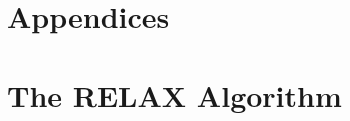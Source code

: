 \documentclass{article}
\begin{document}



\clearpage
\section*{Appendices}
\appendix




\section{The RELAX Algorithm}
\label{relax proof}
\end{document}
